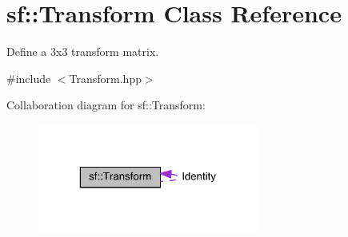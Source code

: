 \hypertarget{classsf_1_1_transform}{\section{sf\-:\-:Transform Class Reference}
\label{classsf_1_1_transform}
}


Define a 3x3 transform matrix.  




{\ttfamily \#include $<$Transform.\-hpp$>$}



Collaboration diagram for sf\-:\-:Transform\-:
\nopagebreak
\begin{figure}[H]
\begin{center}
\leavevmode
\includegraphics[width=208pt]{classsf_1_1_transform__coll__graph}
\end{center}
\end{figure}
